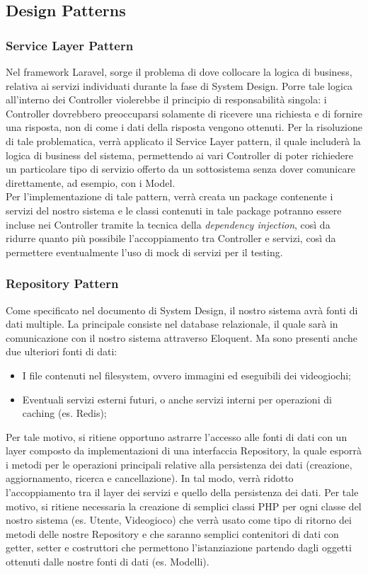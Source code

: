 \subsection{Design Patterns}
\subsubsection{Service Layer Pattern}
Nel framework Laravel, sorge il problema di dove collocare la logica di business, relativa ai servizi individuati durante la fase di System Design. Porre tale logica all’interno dei Controller violerebbe il principio di responsabilità singola: i Controller dovrebbero preoccuparsi solamente di ricevere una richiesta e di fornire una risposta, non di come i dati della risposta vengono ottenuti. Per la risoluzione di tale problematica, verrà applicato il Service Layer pattern, il quale includerà la logica di business del sistema, permettendo ai vari Controller di poter richiedere un particolare tipo di servizio offerto da un sottosistema senza dover comunicare direttamente, ad esempio, con i Model. \\
Per l’implementazione di tale pattern, verrà creata un package contenente i servizi del nostro sistema e le classi contenuti in tale package potranno essere incluse nei Controller tramite la tecnica della \emph{dependency injection}, così da ridurre quanto più possibile l’accoppiamento tra Controller e servizi, così da permettere eventualmente l’uso di mock di servizi per il testing.

\subsubsection{Repository Pattern}
Come specificato nel documento di System Design, il nostro sistema avrà fonti di dati multiple. La principale consiste nel database relazionale, il quale sarà in comunicazione con il nostro sistema attraverso Eloquent. Ma sono presenti anche due ulteriori fonti di dati:
\begin{itemize}
	\item I file contenuti nel filesystem, ovvero immagini ed eseguibili dei videogiochi;
	\item Eventuali servizi esterni futuri, o anche servizi interni per operazioni di caching (es. Redis);
\end{itemize}
Per tale motivo, si ritiene opportuno astrarre l’accesso alle fonti di dati con un layer composto da implementazioni di una interfaccia Repository, la quale esporrà i metodi per le operazioni principali relative alla persistenza dei dati (creazione, aggiornamento, ricerca e cancellazione). In tal modo, verrà ridotto l’accoppiamento tra il layer dei servizi e quello della persistenza dei dati. Per tale motivo, si ritiene necessaria la creazione di semplici classi PHP per ogni classe del nostro sistema (es. Utente, Videogioco) che verrà usato come tipo di ritorno dei metodi delle nostre Repository e che saranno semplici contenitori di dati con getter, setter e costruttori che permettono l’istanziazione partendo dagli oggetti ottenuti dalle nostre fonti di dati (es. Modelli).


